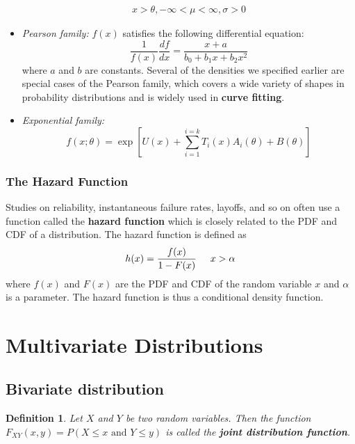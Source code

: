 \documentclass{article}
\newtheorem{definition}{Definition}[section]
\begin{document}
\begin{itemize}
\begin{equation*}
\begin{split}
       x > \theta, -\infty < \mu < \infty, \sigma>0
    \end{split}
    \end{equation*}
    \item \textit{Pearson family:} \(f(x)\) satisfies the following differential equation:
    \begin{equation*}
        \frac{1}{f(x)} \frac{df}{dx} = \frac{x+a}{b_0+b_1x+b_2x^2}
    \end{equation*}
    where \(a\) and \(b\) are constants. Several of the densities we specified earlier are special cases of the Pearson family, which covers a wide variety of shapes in probability distributions and is widely used in \textbf{curve fitting}.
    \item \textit{Exponential family:} 
    \begin{equation*}
    f(x;\theta)=\exp[U(x)+\sum_{i=1}^{i=k} T_i(x)A_i(\theta)+B(\theta)]    
    \end{equation*}
    \end{itemize}

\subsubsection{The Hazard Function}

Studies on reliability, instantaneous failure rates, layoffs, and so on often use a function called the \textbf{hazard function} which is closely related to the PDF and CDF of a distribution. The hazard function is defined as
\begin{equation*}
    h(x)=\frac{f(x)}{1-F(x)} \hspace{0.5cm} x>\alpha
\end{equation*}
where \(f(x)\) and \(F(x)\) are the PDF and CDF of the random variable \(x\) and \(\alpha\) is a parameter. The hazard function is thus a conditional density function.

\section{Multivariate Distributions}

\subsection{Bivariate distribution}

\begin{definition}
    Let \(X\) and \(Y\) be two random variables. Then the function \(F_{XY}(x,y)=P(X\leq x \text{ and } Y \leq y)\) is called the \textbf{joint distribution function}.
\end{definition}
\end{document}
